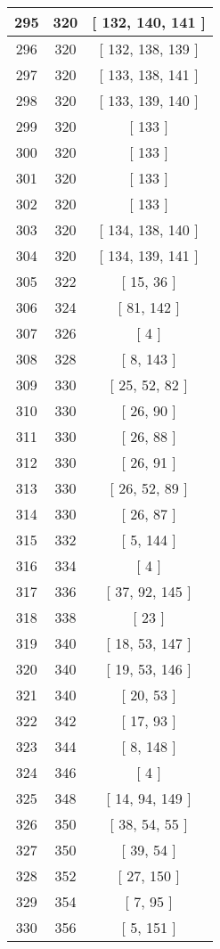 \begin{center}
\begin{longtable}[H]{|| c c c ||}
295 & 320 & [ 132, 140, 141 ]
\\\hline
296 & 320 & [ 132, 138, 139 ]
\\\hline
297 & 320 & [ 133, 138, 141 ]
\\\hline
298 & 320 & [ 133, 139, 140 ]
\\\hline
299 & 320 & [ 133 ]
\\\hline
300 & 320 & [ 133 ]
\\\hline
301 & 320 & [ 133 ]
\\\hline
302 & 320 & [ 133 ]
\\\hline
303 & 320 & [ 134, 138, 140 ]
\\\hline
304 & 320 & [ 134, 139, 141 ]
\\\hline
305 & 322 & [ 15, 36 ]
\\\hline
306 & 324 & [ 81, 142 ]
\\\hline
307 & 326 & [ 4 ]
\\\hline
308 & 328 & [ 8, 143 ]
\\\hline
309 & 330 & [ 25, 52, 82 ]
\\\hline
310 & 330 & [ 26, 90 ]
\\\hline
311 & 330 & [ 26, 88 ]
\\\hline
312 & 330 & [ 26, 91 ]
\\\hline
313 & 330 & [ 26, 52, 89 ]
\\\hline
314 & 330 & [ 26, 87 ]
\\\hline
315 & 332 & [ 5, 144 ]
\\\hline
316 & 334 & [ 4 ]
\\\hline
317 & 336 & [ 37, 92, 145 ]
\\\hline
318 & 338 & [ 23 ]
\\\hline
319 & 340 & [ 18, 53, 147 ]
\\\hline
320 & 340 & [ 19, 53, 146 ]
\\\hline
321 & 340 & [ 20, 53 ]
\\\hline
322 & 342 & [ 17, 93 ]
\\\hline
323 & 344 & [ 8, 148 ]
\\\hline
324 & 346 & [ 4 ]
\\\hline
325 & 348 & [ 14, 94, 149 ]
\\\hline
326 & 350 & [ 38, 54, 55 ]
\\\hline
327 & 350 & [ 39, 54 ]
\\\hline
328 & 352 & [ 27, 150 ]
\\\hline
329 & 354 & [ 7, 95 ]
\\\hline
330 & 356 & [ 5, 151 ]
\\\hline

\end{longtable}
\end{center}
